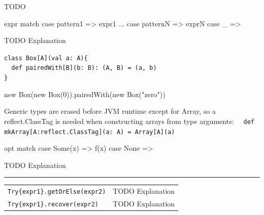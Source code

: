 \documentclass[article, a5paper]{memoir}
\newcommand{\LangColor}{red}
\newcommand{\head}[1]{{\bfseries {\color{\LangColor}{#1}}\par\vspace{1mm}\hrule\vspace{-2mm}}}
\renewcommand{\arraystretch}{0.9}
\newcommand{\code}{\lstinline[basicstyle=\ttfamily]}
\newcommand{\Newline}{\vspace{\baselineskip}}
\begin{document}
{\Newline\head{Tuples}\Newline

TODO



\Newline\head{Pattern matching and type tests}\vspace{0.5em}
\begin{minipage}{0.3\linewidth}%
\begin{Code}
expr match {
  case pattern1 => expr1
  ...
  case patternN => exprN
  case _ =>
}
\end{Code}
\end{minipage}%
\hfill\begin{minipage}{0.6\linewidth}
\raggedright{\small
TODO Explanation
}%
\end{minipage}

\Newline\head{Generic classes and methods}\Newline
{\small
\code|class Box[A](val a: A){ | \\
\code|  def pairedWith[B](b: B): (A, B) = (a, b)| \\
\code|}|

\begin{Code}
new Box(new Box(0)).pairedWith(new Box("zero"))
\end{Code}

Generic types are erased before JVM runtime except for Array, so a reflect.ClassTag is needed when constructing arrays from type arguments: \code|  def mkArray[A:reflect.ClassTag](a: A) = Array[A](a)| 
}%


\Newline\head{Option, Some, None}\vspace{0.5em}
\begin{minipage}{0.3\linewidth}%
\begin{Code}
opt match {
  case Some(x) => f(x)
  case None =>
}
\end{Code}
\end{minipage}%
\hfill\begin{minipage}{0.6\linewidth}
\raggedright{\small
TODO Explanation
}%
\end{minipage}

\head{scala.util.Try}\Newline
{\small\renewcommand{\arraystretch}{1.1}
\begin{tabular}{@{}l l}
\code|Try{expr1}.getOrElse(expr2)| & TODO Explanation \\
\code|Try{expr1}.recover(expr2)| & TODO Explanation \\
\end{tabular}
}

\Newline\head{scala.concurrent.Future}\Newline



}
\end{document}
